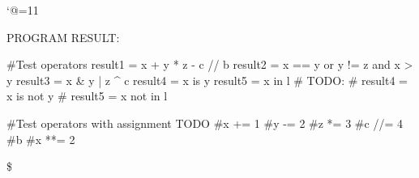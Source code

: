 \let\e\expandafter
\catcode`@=11








\def\@pytexChar@Backslash{\loggingall\@pytexParser@parse}
\let\@pytexChar@Dollar\bye

%

PROGRAM RESULT:

\@pytexCatcodes@setallactive

#Test operators
result1 = x + y * z - c // b %
result2 = x == y or y != z and x > y
result3 = x & y | z ^ c
result4 = x is y
result5 = x in l
# TODO:
# result4 = x is not y
# result5 = x not in l

#Test operators with assignment TODO
#x += 1
#y -= 2
#z *= 3
#c //= 4
#b %
#x **= 2

\$
\bye
